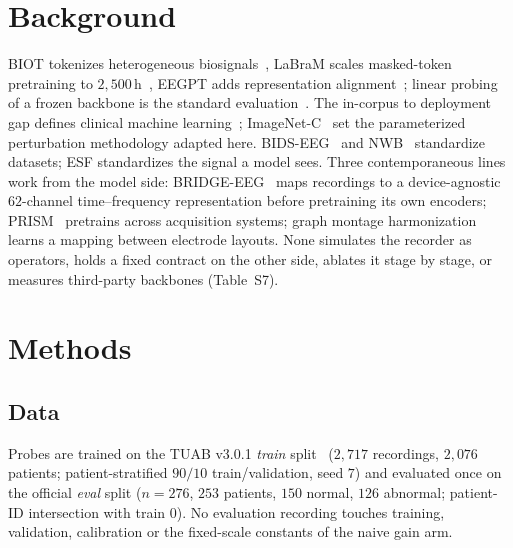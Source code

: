 \documentclass[conference]{IEEEtran}
\begin{document}
\section{Background}
\label{sec:background}
BIOT tokenizes heterogeneous biosignals~\cite{yang2023biot}, LaBraM
scales masked-token pretraining to $2{,}500$\,h~\cite{jiang2024labram},
EEGPT adds representation alignment~\cite{wang2024eegpt}; linear
probing of a frozen backbone is the standard
evaluation~\cite{kornblith2019better}. The in-corpus to deployment gap
defines clinical machine
learning~\cite{zech2018variable,finlayson2021clinician,koh2021wilds};
ImageNet-C~\cite{hendrycks2019benchmarking} set the parameterized
perturbation methodology adapted here. BIDS-EEG~\cite{pernet2019bids}
and NWB~\cite{rubel2022nwb} standardize datasets; ESF standardizes the
signal a model sees. Three contemporaneous lines work from the model
side: BRIDGE-EEG~\cite{chowdhury2026bridge} maps recordings to a
device-agnostic $62$-channel time--frequency representation before
pretraining its own encoders; PRISM~\cite{prism2026} pretrains across
acquisition systems; graph montage
harmonization~\cite{gcnharmonization2026} learns a mapping between
electrode layouts. None simulates the recorder as operators, holds a
fixed contract on the other side, ablates it stage by stage, or
measures third-party backbones (Table~S7).

\section{Methods}
\label{sec:methods}

\subsection{Data}
\label{sec:data}
Probes are trained on the TUAB v3.0.1 \emph{train}
split~\cite{lopez2015abnormal,buckwalter2021tuh} ($2{,}717$ recordings,
$2{,}076$ patients; patient-stratified $90/10$ train/validation, seed
$7$) and evaluated once on the official \emph{eval} split ($n{=}276$,
$253$ patients, $150$ normal, $126$ abnormal; patient-ID intersection
with train $0$). No evaluation recording touches training, validation,
calibration or the fixed-scale constants of the naive gain arm.
\end{document}
